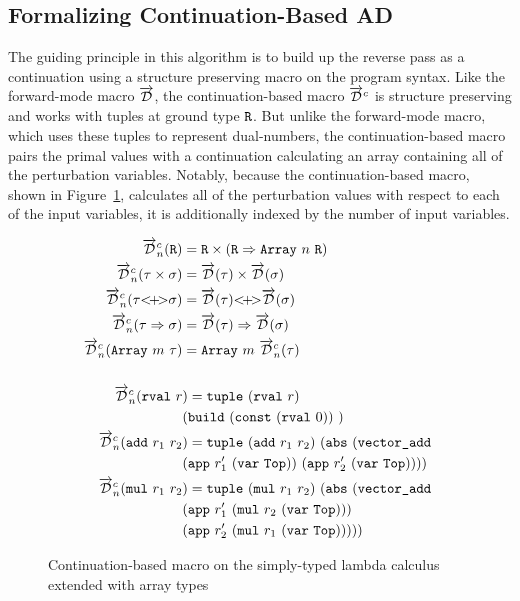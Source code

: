 \subsection{Formalizing Continuation-Based AD}\label{sec:continuation-based}
  The guiding principle in this algorithm is to build up the reverse pass as a continuation using a structure preserving macro on the program syntax.
  Like the forward-mode macro $\overrightarrow{\mathcal{D}}$, the continuation-based macro $\overrightarrow{\mathcal{D}}^c$ is structure preserving and works with tuples at ground type $\texttt{R}$.
  But unlike the forward-mode macro, which uses these tuples to represent dual-numbers, the continuation-based macro pairs the primal values with a continuation calculating an array containing all of the perturbation variables.
  Notably, because the continuation-based macro, shown in Figure~\ref{fig:continuation_macro}, calculates all of the perturbation values with respect to each of the input variables, it is additionally indexed by the number of input variables.

  \begin{figure}[H]
    \centering
    \begin{gather*}
      \begin{aligned}
        \overrightarrow{\mathcal{D}}^c_n(\texttt{R}) &= \texttt{R} \times (\texttt{R} \Rightarrow \texttt{Array}\ n\ \texttt{R}) \\
        \overrightarrow{\mathcal{D}}^c_n(\tau \times \sigma) &= \overrightarrow{\mathcal{D}}(\tau) \times \overrightarrow{\mathcal{D}}(\sigma) \\
        \overrightarrow{\mathcal{D}}^c_n(\tau {<}\!{+}\!{>} \sigma) &= \overrightarrow{\mathcal{D}}(\tau) {<}\!{+}\!{>} \overrightarrow{\mathcal{D}}(\sigma) \\
        \overrightarrow{\mathcal{D}}^c_n(\tau \Rightarrow \sigma) &= \overrightarrow{\mathcal{D}}(\tau) \Rightarrow \overrightarrow{\mathcal{D}}(\sigma) \\
        \overrightarrow{\mathcal{D}}^c_n(\texttt{Array}\ m\ \tau) &= \texttt{Array}\ m\ \overrightarrow{\mathcal{D}}^c_n(\tau) \\
      \\
        \overrightarrow{\mathcal{D}}^c_n(\texttt{rval}\ r&) = \texttt{tuple}\ (\texttt{rval}\ r)\ \\
          &{(\texttt{build}\ (\texttt{const}\ (\texttt{rval}\ 0))\ )} \\
        \overrightarrow{\mathcal{D}}^c_n(\texttt{add}\ r_1\ r_2&) = \texttt{tuple}\ (\texttt{add}\ r_1\ r_2)\ (\texttt{abs}\ (\texttt{vector\_add}\  \\
        &(\texttt{app}\ r_1'\ (\texttt{var}\ \texttt{Top}))\ (\texttt{app}\ r_2'\ (\texttt{var}\ \texttt{Top})))) \\
        \overrightarrow{\mathcal{D}}^c_n(\texttt{mul}\ r_1\ r_2&) = \texttt{tuple}\ (\texttt{mul}\ r_1\ r_2)\ (\texttt{abs}\ (\texttt{vector\_add}\  \\
        &(\texttt{app}\ r_1'\ (\texttt{mul}\ r_2\ (\texttt{var}\ \texttt{Top})))\  \\
        &(\texttt{app}\ r_2'\ (\texttt{mul}\ r_1\ (\texttt{var}\ \texttt{Top}))))) \\
      \end{aligned}
    \end{gather*}
    \caption{Continuation-based macro on the simply-typed lambda calculus extended with array types}
    \label{fig:continuation_macro}
  \end{figure}

